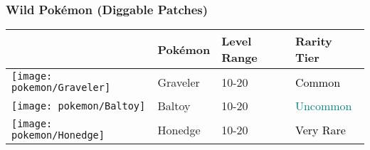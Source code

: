 \subsubsection{Wild Pokémon (Diggable Patches)}%
\label{ssubsec:WildPokmon(DiggablePatches)}%
\begin{longtable}{||l l l l||}%
\hline%
&Pokémon&Level Range&Rarity Tier\\%
\hline%
\endhead%
\hline%
\texttt{[image: pokemon/Graveler]}&Graveler&10{-}20&\textcolor{black}{%
Common%
}\\%
\hline%
\texttt{[image: pokemon/Baltoy]}&Baltoy&10{-}20&\textcolor{teal}{%
Uncommon%
}\\%
\hline%
\texttt{[image: pokemon/Honedge]}&Honedge&10{-}20&\textcolor{black}{%
Very Rare%
}\\%
\hline%
\end{longtable}%
\caption{Wild Pokemon in Route 211 (Diggable Patches)}